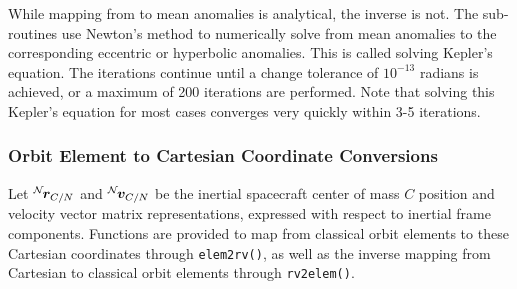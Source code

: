 While mapping from to mean anomalies is analytical, the inverse is not.  The sub-routines use Newton's method to numerically solve from mean anomalies to the corresponding eccentric or hyperbolic anomalies.  This is called solving Kepler's equation.  The iterations continue until a change tolerance of $10^{-13}$ radians is achieved, or a maximum of 200 iterations are performed.  Note that solving this Kepler's equation for most cases converges very quickly within 3-5 iterations.  




\subsubsection{Orbit Element to Cartesian Coordinate Conversions}
Let $\leftexp{N}{\bm r}_{C/N}$ and $\leftexp{N}{\bm v}_{C/N}$ be the inertial spacecraft center of mass $C$ position and velocity vector matrix representations, expressed with respect to inertial frame  components.  Functions are provided to map from classical orbit elements to these Cartesian coordinates through {\tt elem2rv()}, as well as the inverse mapping from Cartesian to classical orbit elements through {\tt rv2elem()}.  

